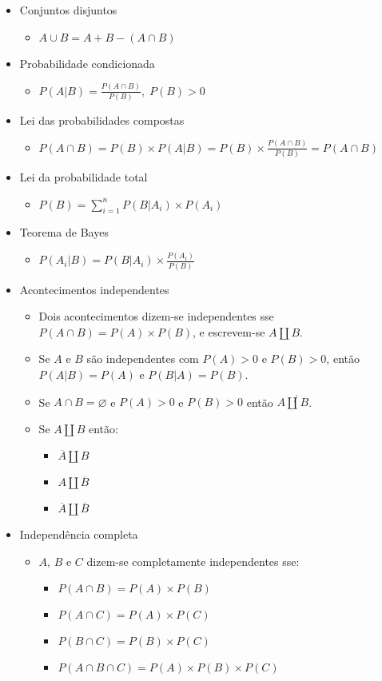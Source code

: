 \documentclass[a4paper]{report}
\begin{document}
\begin{itemize}
\begin{itemize}
\begin{itemize}
			\end{itemize}
		\end{itemize}
		\item Conjuntos disjuntos
		\begin{itemize}
			\item $A\cup B=A+B-(A\cap B)$
		\end{itemize}
		\item Probabilidade condicionada
		\begin{itemize}
			\item $P(A|B)=\frac{P(A\cap B)}{P(B)},\; P(B)>0$
		\end{itemize}
		\item Lei das probabilidades compostas
		\begin{itemize}
			\item $P(A\cap B)=P(B)\times P(A|B)=P(B)\times\frac{P(A\cap B)}{P(B)}=P(A\cap B)$
		\end{itemize}
		\item Lei da probabilidade total
		\begin{itemize}
			\item $P(B)=\sum_{i=1}^n P(B|A_i)\times P(A_i)$
		\end{itemize}
		\item Teorema de Bayes
		\begin{itemize}
			\item $P(A_i|B)=P(B|A_i)\times\frac{P(A_i)}{P(B)}$
		\end{itemize}
		\item Acontecimentos independentes
		\begin{itemize}
			\item Dois acontecimentos dizem-se independentes sse $P(A\cap B)=P(A)\times P(B)$, e escrevem-se $A\amalg B$.
			\item Se $A$ e $B$ são independentes com $P(A)>0$ e $P(B)>0$, então $P(A|B)=P(A)$ e $P(B|A)=P(B)$.
			\item Se $A\cap B=\varnothing$ e $P(A)>0$ e $P(B)>0$ então $A\not{\amalg}B$.
			\item Se $A\amalg B$ então:
			\begin{itemize}
				\item $\overline A\amalg B$
				\item $A\amalg\overline B$
				\item $\overline A\amalg\overline B$
			\end{itemize}
		\end{itemize}
		\item Independência completa
		\begin{itemize}
			\item $A$, $B$ e $C$ dizem-se completamente independentes sse:
			\begin{itemize}
				\item $P(A\cap B)=P(A)\times P(B)$
				\item $P(A\cap C)=P(A)\times P(C)$
				\item $P(B\cap C)=P(B)\times P(C)$
				\item $P(A\cap B\cap C)=P(A)\times P(B)\times P(C)$
			\end{itemize}
		\end{itemize}
	\end{itemize}
\end{document}

